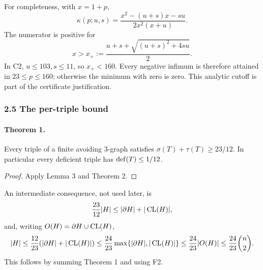 For completeness, with $x=1+p$,
\[
 \kappa(p;u,s)=\frac{x^2-(u+s)x-su}{2x^2(x+u)}.
\]
The numerator is positive for
\[
 x>x_+:=\frac{u+s+\sqrt{(u+s)^2+4su}}2.
\]
In C2, $u\leq103,s\leq11$, so $x_+<160$. Every negative infimum is therefore attained in $23\leq p\leq160$; otherwise the minimum with zero is zero. This analytic cutoff is part of the certificate justification.

\subsubsection*{2.5 The per-triple bound}
\paragraph{Theorem 1.} Every triple of a finite avoiding $3$-graph satisfies $\sigma(T)+\tau(T)\geq23/12$. In particular every deficient triple has $\operatorname{def}(T)\leq1/12$.
\begin{proof} Apply Lemma 3 and Theorem 2.\end{proof}
An intermediate consequence, not used later, is
\[
 \frac{23}{12}|H|\leq|\partial H|+|\operatorname{CL}(H)|,
\]
and, writing $O(H)=\partial H\cup\operatorname{CL}(H)$,
\[
 |H|\leq\frac{12}{23}(|\partial H|+|\operatorname{CL}(H)|)
 \leq\frac{24}{23}\max\{|\partial H|,|\operatorname{CL}(H)|\}
 \leq\frac{24}{23}|O(H)|\leq\frac{24}{23}\binom n2.
\]
This follows by summing Theorem 1 and using F2.
